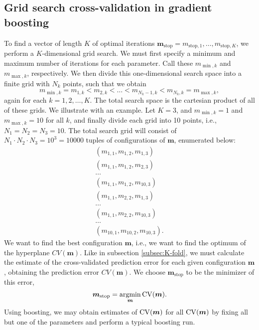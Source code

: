 \subsection{Grid search cross-validation in gradient boosting}\label{grid-search}
To find a vector of length $K$ of optimal iterations $\boldsymbol{m}_{\text{stop}}=m_{\text{stop},1},\ldots,m_{\text{stop},K}$, we perform a $K$-dimensional grid search.
We must first specify a minimum and maximum number of iterations for each parameter.
Call these $m_{\min,k}$ and $m_{\max,k}$, respectively.
We then divide this one-dimensional search space into a finite grid with $N_k$ points, such that we obtain
\begin{equation*} 
    m_{\min,k}=m_{1,k}<m_{2,k}<\ldots<m_{N_k-1,k}<m_{N_k,k}=m_{\max,k},
\end{equation*}
again for each $k=1,2,\ldots,K$.
The total search space is the cartesian product of all of these grids.
We illustrate with an example. Let $K=3$, and $m_{\min,k}=1$ and $m_{\max,k}=10$ for all $k$, and finally divide each grid into 10 points, i.e., $N_1=N_2=N_3=10$.
The total search grid will consist of $N_1\cdot N_2\cdot N_3=10^3=10000$ tuples of configurations of $\boldsymbol{m}$, enumerated below:
\begin{align*}
    \left(m_{1,1},m_{1,2},m_{1,3}\right) \\
    \left(m_{1,1},m_{1,2},m_{2,3}\right) \\
    \ldots \\
    \left(m_{1,1},m_{1,2},m_{10,3}\right) \\
    \left(m_{1,1},m_{2,2},m_{1,3}\right) \\
    \ldots \\
    \left(m_{1,1},m_{2,2},m_{10,3}\right) \\
    \ldots \\
    \left(m_{10,1},m_{10,2},m_{10,3}\right).
\end{align*}
We want to find the best configuration $\boldsymbol{m}$, i.e., we want to find the optimum of the hyperplane $CV(\boldsymbol{m})$.
Like in subsection \ref{subsec:K-fold}, we must calculate the estimate of the cross-validated prediction error for each given configuration $\boldsymbol{m}$, obtaining the prediction error $CV(\boldsymbol{m})$.
We choose $\boldsymbol{m}_{\text{stop}}$ to be the minimizer of this error,
\begin{equation*}
    \boldsymbol{m}_{\text{stop}}=\operatorname*{argmin}_{\boldsymbol{m}}\operatorname{CV}(\boldsymbol{m}).
\end{equation*}
Using boosting, we may obtain estimates of $\operatorname{CV}(\boldsymbol{m})$ for all $\operatorname{CV}(\boldsymbol{m})$ by fixing all but one of the parameters and perform a typical boosting run.
